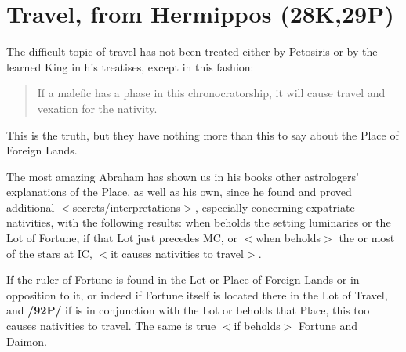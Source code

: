 \section{Travel, from Hermippos (28K,29P)}

The difficult topic of travel has not been treated either by Petosiris or by the learned King in his treatises, except in this fashion: \begin{quote}If a malefic has a phase in this chronocratorship, it will cause travel and vexation for the nativity.\end{quote} This is the truth, but they have nothing more than this to say about the Place of Foreign Lands. 

The most amazing Abraham has shown us in his books other astrologers’ explanations of the Place, as well as his own, since he found and proved additional $<$secrets/interpretations$>$, especially concerning expatriate nativities, with the following results: when \Mars\xspace beholds the setting luminaries or
the Lot of Fortune, if that Lot just precedes MC, or $<$when \Mars\xspace beholds$>$ the \Moon\xspace or most of the stars at
IC, $<$it causes nativities to travel$>$. 

If the ruler of Fortune is found in the Lot or Place of Foreign Lands or in opposition to it, or indeed if Fortune itself is located there in the Lot of Travel, and \textbf{/92P/} if \Mars\xspace is in conjunction with the Lot or beholds that Place, this too causes nativities to travel. The same is true $<$if \Mars\xspace beholds$>$ Fortune and Daimon.


\newpage